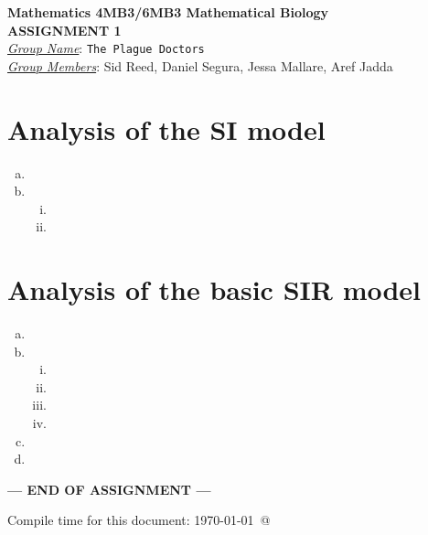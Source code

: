 \documentclass[12pt]{article}
\begin{document}
\begin{center}
{\bfseries Mathematics 4MB3/6MB3 Mathematical Biology\\
 ASSIGNMENT {\color{blue}1}}\\
\medskip
\underline{\emph{Group Name}}: \texttt{{\color{blue}The Plague Doctors}}\\
\medskip
\underline{\emph{Group Members}}: {\color{blue}Sid Reed, Daniel Segura, Jessa Mallare, Aref Jadda}
\end{center}
\section{Analysis of the SI model}
\SIanalIntro
\begin{enumerate}[(a)]
    \item 
    \item \begin{enumerate}[(i)]
        \item 
        \item 
    \end{enumerate}
\end{enumerate}
\section{Analysis of the basic SIR  model}
\begin{enumerate}[(a)]
    \item 
    \item \begin{enumerate}[(i)]
          \item 
          \item 
          \item 
          \item 
      \end{enumerate}
    \item 
    \item 
\end{enumerate}
\centerline{\bf--- END OF ASSIGNMENT ---}
\bigskip
Compile time for this document:
\today\ @ \thistime
\end{document}
